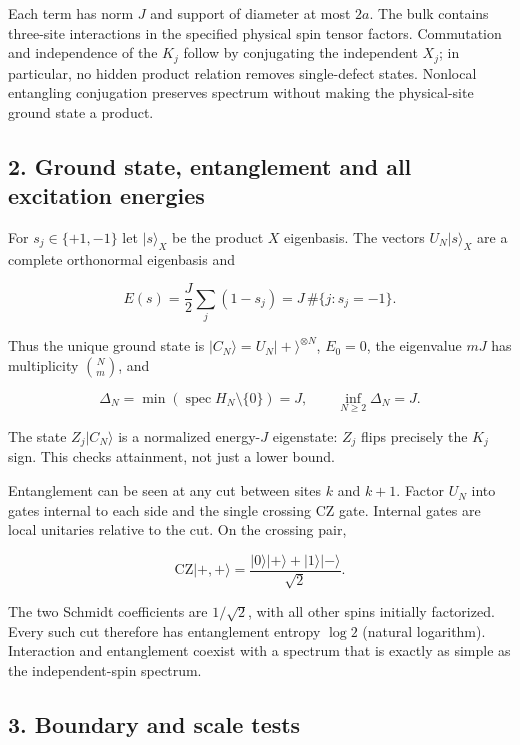 \documentclass[11pt,a4paper]{article}
\begin{document}
Each term has norm \(J\) and support of diameter at most \(2a\). The
bulk contains three-site interactions in the specified physical spin
tensor factors. Commutation and independence of the \(K_j\) follow by
conjugating the independent \(X_j\); in particular, no hidden product
relation removes single-defect states. Nonlocal entangling conjugation
preserves spectrum without making the physical-site ground state a
product.

\hypertarget{ground-state-entanglement-and-all-excitation-energies}{%
\subsection{2. Ground state, entanglement and all excitation
energies}\label{ground-state-entanglement-and-all-excitation-energies}}

For \(s_j\in\{+1,-1\}\) let \(|s\rangle_X\) be the product \(X\)
eigenbasis. The vectors \(U_N|s\rangle_X\) are a complete orthonormal
eigenbasis and

\[
E(s)=\frac J2\sum_j(1-s_j)=J\,\#\{j:s_j=-1\}.
\]

Thus the unique ground state is
\(|C_N\rangle=U_N|+\rangle^{\otimes N}\), \(E_0=0\), the eigenvalue
\(mJ\) has multiplicity \(\binom Nm\), and

\[
\Delta_N=\min(\operatorname{spec}H_N\setminus\{0\})=J,
\qquad \inf_{N\ge2}\Delta_N=J.
\]

The state \(Z_j|C_N\rangle\) is a normalized energy-\(J\) eigenstate:
\(Z_j\) flips precisely the \(K_j\) sign. This checks attainment, not
just a lower bound.

Entanglement can be seen at any cut between sites \(k\) and \(k+1\).
Factor \(U_N\) into gates internal to each side and the single crossing
CZ gate. Internal gates are local unitaries relative to the cut. On the
crossing pair,

\[
\mathrm{CZ}|+,+\rangle=
\frac{|0\rangle|+\rangle+|1\rangle|-\rangle}{\sqrt2}.
\]

The two Schmidt coefficients are \(1/\sqrt2\), with all other spins
initially factorized. Every such cut therefore has entanglement entropy
\(\log2\) (natural logarithm). Interaction and entanglement coexist with
a spectrum that is exactly as simple as the independent-spin spectrum.

\hypertarget{boundary-and-scale-tests}{%
\subsection{3. Boundary and scale
tests}\label{boundary-and-scale-tests}}
\end{document}
